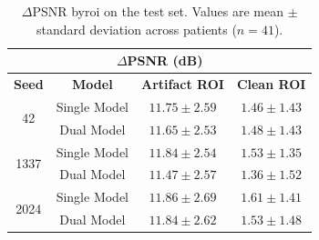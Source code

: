 \begin{table}[htbp]
    \centering
    \small
    \begin{tabular}{cccc}
        \multicolumn{4}{c}{\textbf{$\Delta$PSNR (dB)}} \\[4pt]
        \hline
        \textbf{Seed} & \textbf{Model} & \textbf{Artifact ROI} & \textbf{Clean ROI} \\
        \hline
        \multirow{2}{*}{42} & Single Model & $11.75 \pm 2.59$ & $1.46 \pm 1.43$ \\
                             & Dual Model   & $11.65 \pm 2.53$ & $1.48 \pm 1.43$ \\
        \hline
        \multirow{2}{*}{1337} & Single Model & $11.84 \pm 2.54$ & $1.53 \pm 1.35$ \\
                               & Dual Model   & $11.47 \pm 2.57$ & $1.36 \pm 1.52$ \\
        \hline
        \multirow{2}{*}{2024} & Single Model & $11.86 \pm 2.69$ & $1.61 \pm 1.41$ \\
                               & Dual Model   & $11.84 \pm 2.62$ & $1.53 \pm 1.48$ \\
        \hline
    \end{tabular}
    \captionsetup{skip=2pt}
    \caption[ROI $\Delta$PSNR]{$\Delta$PSNR by\acrshort{roi} on the test set. Values are mean $\pm$ standard deviation across patients ($n=41$).}
    \label{tab:roi-delta-psnr}
\end{table}

